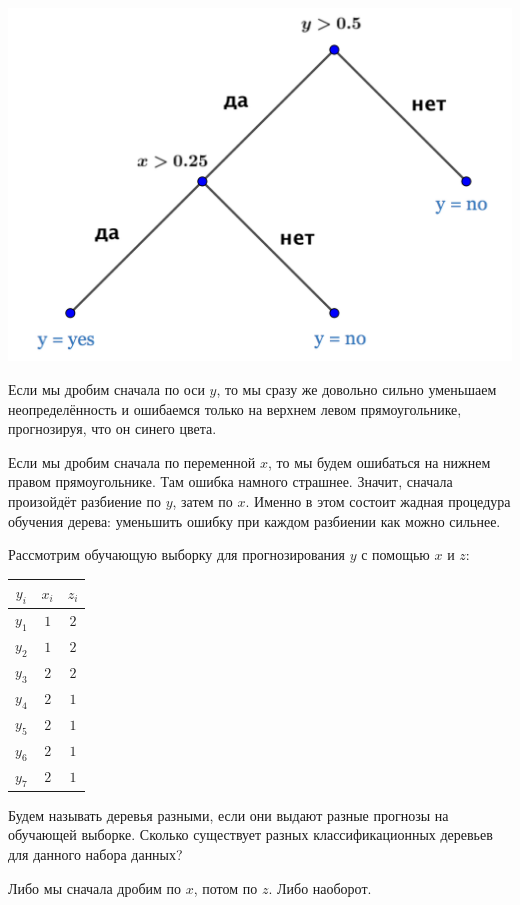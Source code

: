\documentclass[12pt, a4paper, oneside]{article}
\theoremstyle{plain} %
\theoremstyle{definition}
\newcounter{problem}%
\renewcommand{\theproblem}{\arabic{problem}}
\newenvironment{problem}[1]{
\addtocounter{problem}{1}\noindent{ \color{titleblue} \large \bfseries Упражнение~\theproblem~#1 \vspace{1ex} \newline}
}{ }
\begin{document}
\begin{solution}
\begin{center}
	\includegraphics[scale=0.2]{class_tree_3.png}
\end{center} 	
	
Если мы дробим сначала по оси $y$, то мы сразу же довольно сильно уменьшаем неопределённость и ошибаемся только на верхнем левом прямоугольнике, прогнозируя, что он синего цвета. 
	
Если мы дробим сначала по переменной $x$, то мы будем ошибаться на нижнем правом прямоугольнике. Там ошибка намного страшнее. Значит, сначала произойдёт разбиение по $y$, затем по $x$. Именно в этом состоит жадная процедура обучения дерева: уменьшить ошибку при каждом разбиении как можно сильнее. 
\end{solution}

\begin{problem}{}
Рассмотрим обучающую выборку для прогнозирования $y$ с помощью $x$ и $z$:

\begin{center}
	\begin{tabular}{c|c|c}
		$y_i$ & $x_i$ & $z_i$ \\
		\hline
		$y_1$ & $1$ & $2$ \\
		$y_2$ & $1$ & $2$ \\
		$y_3$ & $2$ & $2$ \\
		$y_4$ & $2$ & $1$\\
		$y_5$ & $2$ & $1$ \\
		$y_6$ & $2$ & $1$ \\
		$y_7$ & $2$ & $1$ \\
	\end{tabular}
\end{center}

Будем называть деревья разными, если они выдают разные прогнозы на обучающей выборке. Сколько существует разных классификационных деревьев  для данного набора данных?
\end{problem}

\begin{solution}
Либо мы сначала дробим по $x$, потом по $z$. Либо наоборот. 	\end{solution}
\end{document}
